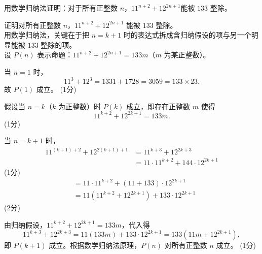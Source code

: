 \documentclass[12pt,a4paper]{exam-zh}
\newcommand{\qscoreoffset}{4em}
\newcommand{\qscore}[1]{%
    \leavevmode\unskip\nobreak\hfill
    \makebox[0pt][l]{\makebox[\qscoreoffset][r]{(#1\%)}}%
}
\begin{document}


\begin{question}[points = 6]
    用数学归纳法证明：对于所有正整数 $n$，$\displaystyle 11^{n+2} + 12^{2n+1}$能被 $133$ 整除。
    \qscore{6}
\end{question}

\begin{solution}
    证明对所有正整数 $n$，$11^{n+2} + 12^{2n+1}$ 能被 $133$ 整除。 \\
    用数学归纳法，关键在于把 $n=k+1$ 时的表达式拆成含归纳假设的项与另一个明显能被 $133$ 整除的项。 \\
    设 $P(n)$ 表示命题：$11^{n+2} + 12^{2n+1} = 133m$（$m$ 为某正整数）。

    当 $n=1$ 时，
    \[
        11^{3} + 12^{3} = 1331 + 1728 = 3059 = 133 \times 23.
    \]
    故 $P(1)$ 成立。
    \hfill (1分)

    假设当 $n=k$（$k$ 为正整数）时 $P(k)$ 成立，即存在正整数 $m$ 使得
    \[
        11^{k+2} + 12^{2k+1} = 133m.
    \]
    \hfill (1分)

    当 $n=k+1$ 时，
    \begin{align*}
        11^{(k+1)+2} + 12^{2(k+1)+1}
        &= 11^{k+3} + 12^{2k+3} \\
        &= 11\cdot 11^{k+2} + 144\cdot 12^{2k+1}
    \end{align*}
    \hfill (1分)
    \begin{align*}
        &= 11\cdot 11^{k+2} + (11+133)\cdot 12^{2k+1} \\
        &= 11\left(11^{k+2} + 12^{2k+1}\right) + 133\cdot 12^{2k+1}
    \end{align*}
    \hfill (2分)

    由归纳假设，$11^{k+2}+12^{2k+1}=133m$，代入得
    \[
        11^{k+3} + 12^{2k+3} = 11(133m) + 133\cdot 12^{2k+1} = 133\left(11m + 12^{2k+1}\right),
    \]
    即 $P(k+1)$ 成立。根据数学归纳法原理，$P(n)$ 对所有正整数 $n$ 成立。
    \hfill (1分)
\end{solution}
\end{document}
